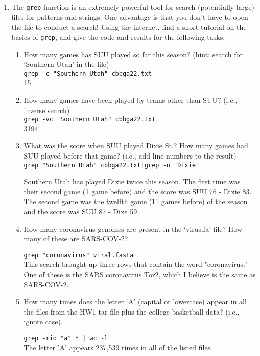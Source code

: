 \documentclass[11pt]{article}
\begin{document}
\begin{enumerate}
	\item The \texttt{grep} function is an extremely powerful tool for search (potentially large) files for patterns and strings. One advantage is that you don't have to open the file to conduct a search! Using the internet, find a short tutorial on the basics of \texttt{grep}, and give the code and results for the following tasks: 
		\begin{enumerate}
		\item How many games has SUU played so far this season? (hint: search for `Southern Utah' in the file) \\
		\texttt{grep -c "Southern Utah" cbbga22.txt }
		\\ 15
		\item How many games have been played by teams other than SUU? (i.e., inverse search) \\
		\texttt{grep -vc "Southern Utah" cbbga22.txt} \\
		3194
		\item What was the score when SUU played Dixie St.? How many games had SUU played before that game? (i.e., add line numbers to the result) \\
		\texttt{grep "Southern Utah" cbbga22.txt|grep -n "Dixie" }
		
		Southern Utah has played Dixie twice this season. The first time was their second game (1 game before) and the score was SUU 76 - Dixie 83. The second game was the twelfth game (11 games before) of the season and the score was SUU 87 - Dixe 59. 
		
		\item How many coronavirus genomes are present in the `virus.fa' file? How many of these are SARS-COV-2? 
		
		\texttt{grep "coronavirus" viral.fasta}
		\\
		This search brought up three rows that contain the word "coronavirus." One of these is the SARS coronavirus Tor2, which I believe is the same as SARS-COV-2. 
		
		\item How many times does the letter `A' (capital or lowercase) appear in all the files from the HW1 tar file plus the college basketball data? (i.e., ignore case).
		
		\texttt{grep -rio "a" * | wc -l}\\
		The letter 'A' appears 237,539 times in all of the listed files. 
		

\end{enumerate}
\end{enumerate}
\end{document}
